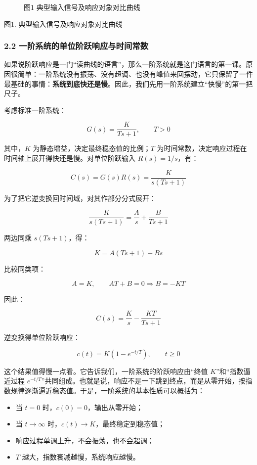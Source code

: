 \documentclass[
  11pt]{article}
\providecommand{\tightlist}{%
  \setlength{\itemsep}{0pt}\setlength{\parskip}{0pt}}
\begin{document}
\begin{figure}
\centering

\caption{图1 典型输入信号及响应对象对比曲线}
\end{figure}

图1. 典型输入信号及响应对象对比曲线

\subsubsection{2.2
一阶系统的单位阶跃响应与时间常数}\label{ux4e00ux9636ux7cfbux7edfux7684ux5355ux4f4dux9636ux8dc3ux54cdux5e94ux4e0eux65f6ux95f4ux5e38ux6570}

如果说阶跃响应是一门``读曲线的语言''，那么一阶系统就是这门语言的第一课。原因很简单：一阶系统没有振荡、没有超调、也没有峰值来回摆动，它只保留了一件最基础的事情：\textbf{系统到底快还是慢}。因此，我们先用一阶系统建立``快慢''的第一把尺子。

考虑标准一阶系统：

\[
G(s) = \frac{K}{Ts + 1}, \qquad T > 0
\]

其中，\(K\) 为静态增益，决定最终稳态值的比例；\(T\)
为时间常数，决定响应过程在时间轴上展开得快还是慢。对单位阶跃输入
\(R(s)=1/s\)，有：

\[
C(s) = G(s)R(s) = \frac{K}{s(Ts+1)}
\]

为了把它逆变换回时间域，对其作部分分式展开：

\[
\frac{K}{s(Ts+1)} = \frac{A}{s} + \frac{B}{Ts+1}
\]

两边同乘 \(s(Ts+1)\)，得：

\[
K = A(Ts+1) + Bs
\]

比较同类项：

\[
A = K, \qquad AT + B = 0 \Rightarrow B = -KT
\]

因此：

\[
C(s) = \frac{K}{s} - \frac{KT}{Ts+1}
\]

逆变换得单位阶跃响应：

\[
c(t) = K\left(1-e^{-t/T}\right), \qquad t \ge 0
\]

这个结果值得慢一点看。它告诉我们，一阶系统的阶跃响应由``终值
\(K\)''和``指数逼近过程
\(e^{-t/T}\)''共同组成。也就是说，响应不是一下跳到终点，而是从零开始，按指数规律逐渐逼近稳态值。于是，一阶系统的基本性质可以概括为：

\begin{itemize}
\tightlist
\item
  当 \(t=0\) 时，\(c(0)=0\)，输出从零开始；
\item
  当 \(t\to\infty\) 时，\(c(t)\to K\)，最终稳定到稳态值；
\item
  响应过程单调上升，不会振荡，也不会超调；
\item
  \(T\) 越大，指数衰减越慢，系统响应越慢。
\end{itemize}
\end{document}
